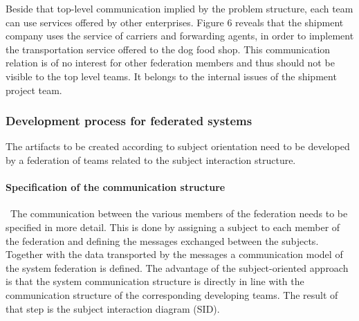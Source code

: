 Beside that top-level communication implied by the problem structure, each team can use services offered by other enterprises. Figure 6 reveals that the shipment company uses the service of carriers and forwarding agents, in order to implement the transportation service offered to the dog food shop. This communication relation is of no interest for other federation members and thus should not be visible to the top level teams. It belongs to the internal issues of the shipment project team.
\\
\subsubsection{Development process for federated systems}
 The artifacts to be created according to subject orientation need to be developed by a federation of teams related to the subject interaction structure.

\paragraph{Specification of the communication structure}\
The communication between the various members of the federation needs to be specified in more detail. This is done by assigning a subject to each member of the federation and defining the messages exchanged between the subjects. Together with the data transported by the messages a communication model of the system federation is defined. The advantage of the subject-oriented approach is that the system communication structure is directly in line with the communication structure of the corresponding developing teams. The result of that step is the subject interaction diagram (SID).

